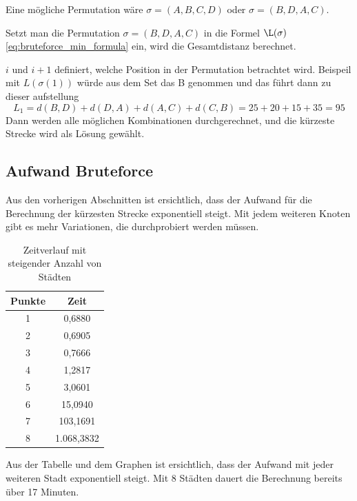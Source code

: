 Eine mögliche Permutation wäre $\sigma = (A, B, C, D)$ oder $\sigma = (B, D, A, C)$.

Setzt man die Permutation $\sigma = (B, D, A, C)$ in die Formel $\L(\sigma)$
\ref{eq:bruteforce_min_formula} ein, wird die Gesamtdistanz berechnet.


\(i\) und \(i+1\) definiert, welche Position in der Permutation betrachtet wird. 
Beispeil mit \( L(\sigma(1)) \) würde aus dem Set das B genommen und das führt 
dann zu dieser aufstellung
\begin{equation}
    L_1 = d(B, D) + d(D, A) + d(A, C) + d(C, B)
    = 25 + 20 + 15 + 35 = 95
\end{equation}
Dann werden alle möglichen Kombinationen durchgerechnet, und die kürzeste 
Strecke wird als Lösung gewählt.

\subsection{Aufwand Bruteforce
    \label{variationsprinzip_algorithmen:section:bruteforce_efforts}}
Aus den vorherigen Abschnitten ist ersichtlich, dass der Aufwand für die 
Berechnung der kürzesten Strecke exponentiell steigt. Mit jedem weiteren 
Knoten gibt es mehr Variationen, die durchprobiert werden müssen. 

\begin{table}[ht]
    \centering
    \caption{Zeitverlauf mit steigender Anzahl von Städten}
    \begin{tabular}{cc}
        \toprule
        Punkte & Zeit       \\
        \midrule
        1      & 0,6880     \\
        2      & 0,6905     \\
        3      & 0,7666     \\
        4      & 1,2817     \\
        5      & 3,0601     \\
        6      & 15,0940    \\
        7      & 103,1691   \\
        8      & 1.068,3832 \\
        \bottomrule
    \end{tabular}
\end{table}


Aus der Tabelle und dem Graphen ist ersichtlich, dass der Aufwand mit 
jeder weiteren Stadt exponentiell steigt. Mit 8 Städten dauert die
Berechnung bereits über 17 Minuten.
